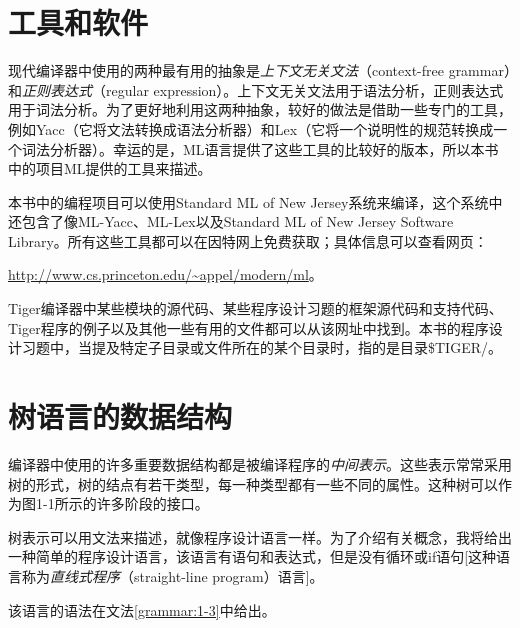 \documentclass[cn,11pt,chinese]{elegantbook}
\begin{document}
\section{工具和软件}

现代编译器中使用的两种最有用的抽象是\textit{上下文无关文法}（context-free grammar）和\textit{正则表达式}（regular expression）。上下文无关文法用于语法分析，正则表达式用于词法分析。为了更好地利用这两种抽象，较好的做法是借助一些专门的工具，例如Yacc（它将文法转换成语法分析器）和Lex（它将一个说明性的规范转换成一个词法分析器）。幸运的是，ML语言提供了这些工具的比较好的版本，所以本书中的项目ML提供的工具来描述。

本书中的编程项目可以使用Standard ML of New Jersey系统来编译，这个系统中还包含了像ML-Yacc、ML-Lex以及Standard ML of New Jersey Software Library。所有这些工具都可以在因特网上免费获取；具体信息可以查看网页：

\href{http://www.cs.princeton.edu/\textasciitilde appel/modern/ml}{http://www.cs.princeton.edu/\textasciitilde appel/modern/ml}。

Tiger编译器中某些模块的源代码、某些程序设计习题的框架源代码和支持代码、Tiger程序的例子以及其他一些有用的文件都可以从该网址中找到。本书的程序设计习题中，当提及特定子目录或文件所在的某个目录时，指的是目录\$TIGER/。

\section{树语言的数据结构}

编译器中使用的许多重要数据结构都是被编译程序的\textit{中间表示}。这些表示常常采用树的形式，树的结点有若干类型，每一种类型都有一些不同的属性。这种树可以作为图1-1所示的许多阶段的接口。

树表示可以用文法来描述，就像程序设计语言一样。为了介绍有关概念，我将给出一种简单的程序设计语言，该语言有语句和表达式，但是没有循环或if语句[这种语言称为\textit{直线式程序}（straight-line program）语言]。

该语言的语法在文法\ref{grammar:1-3}中给出。
\end{document}
